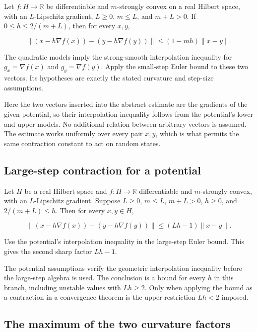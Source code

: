 \documentclass[11pt,a4paper]{report}
\begin{document}
Let \(f:H\to\mathbb R\) be differentiable and \(m\)-strongly convex on a real Hilbert space, with an \(L\)-Lipschitz gradient, \(L\ge0\), \(m\le L\), and \(m+L>0\). If \(0\le h\le2/(m+L)\), then for every \(x,y\),

\[\|(x-h\nabla f(x))-(y-h\nabla f(y))\|\le(1-mh)\|x-y\|.\]

The quadratic models imply the strong-smooth interpolation inequality for \(g_x=\nabla f(x)\) and \(g_y=\nabla f(y)\). Apply the small-step Euler bound to these two vectors. Its hypotheses are exactly the stated curvature and step-size assumptions.



Here the two vectors inserted into the abstract estimate are the gradients of the given potential, so their interpolation inequality follows from the potential's lower and upper models. No additional relation between arbitrary vectors is assumed. The estimate works uniformly over every pair \(x,y\), which is what permits the same contraction constant to act on random states.

\subsection{\texorpdfstring{Large-step contraction for a potential}{Large-step contraction for a potential}}
\label{report-step-UnadjustedLangevin-SharpContraction-lean-8}


Let \(H\) be a real Hilbert space and \(f:H\to\mathbb R\) differentiable and \(m\)-strongly convex, with an \(L\)-Lipschitz gradient. Suppose \(L\ge0\), \(m\le L\), \(m+L>0\), \(h\ge0\), and \(2/(m+L)\le h\). Then for every \(x,y\in H\),

\[\|(x-h\nabla f(x))-(y-h\nabla f(y))\|\le(Lh-1)\|x-y\|.\]

Use the potential's interpolation inequality in the large-step Euler bound. This gives the second sharp factor \(Lh-1\).



The potential assumptions verify the geometric interpolation inequality before the large-step algebra is used. The conclusion is a bound for every \(h\) in this branch, including unstable values with \(Lh\ge2\). Only when applying the bound as a contraction in a convergence theorem is the upper restriction \(Lh<2\) imposed.

\subsection{\texorpdfstring{The maximum of the two curvature factors}{The maximum of the two curvature factors}}
\label{report-step-UnadjustedLangevin-SharpContraction-lean-9}
\end{document}
